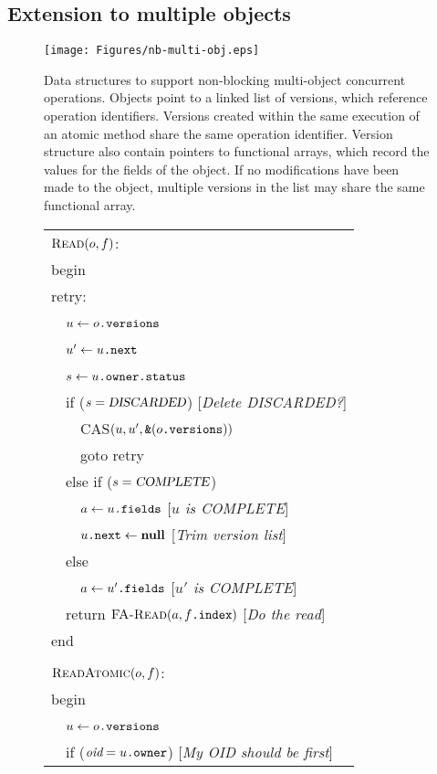 \documentclass{csa-sig-alternate}
\newcommand{\funcname}[1]{\ensuremath{\text{\sc #1}}}
\newcommand{\var}[1]{\ensuremath{\text{\it #1}}}
\newcommand{\fref}[2]{\ensuremath{#1\text{\tt .#2}}}
\newcommand{\addr}[1]{\ensuremath{\text{\tt \&}(#1)}}
\begin{document}
{\subsection{Extension to multiple objects}
\begin{figure}[t]\centering
\texttt{[image: Figures/nb-multi-obj.eps]}
\figadjust%
\caption{Data structures to support non-blocking multi-object
  concurrent operations.  Objects point to a linked list of versions,
  which reference operation identifiers.  Versions created within the
  same execution of an atomic method share the same operation
  identifier.  Version structure also contain pointers to functional
  arrays, which record the values for the fields of the object.
  If no modifications have been made to the object, multiple versions
  in the list may share the same functional array.}
\label{fig:multi-o}
\end{figure}
\begin{figure}[p]
\renewcommand{\>}{~~}
\newcommand{\com}[1]{\hfill [{\sl #1}]}
\begin{tabular}{l}
$\funcname{Read}(o, f)$:\\
begin\\
retry:\\
\>$u \gets \fref{o}{versions}$ \\
\>$u' \gets \fref{u}{next}$ \\
\>$s  \gets \fref{\fref{u}{owner}}{status}$ \\
\>if ($s=\text{\sl DISCARDED}$) \com{Delete DISCARDED?}\\
\>\>CAS$(u, u', \addr{\fref{o}{versions}})$\\
\>\>goto retry \\
\>else if ($s=\text{\sl COMPLETE}$)\\
\>\>$a \gets \fref{u}{fields}$ \com{$u$ is COMPLETE}\\
\>\>$\fref{u}{next} \gets \text{\bf null}$ \com{Trim version list}\\
\>else\\
\>\>$a \gets \fref{u'}{fields}$ \com{$u'$ is COMPLETE}\\
\>return $\funcname{FA-Read}(a, \fref{f}{index})$ \com{Do the read}\\
end\\
\\
$\funcname{ReadAtomic}(o, f)$:\\
begin\\
\>$u \gets \fref{o}{versions}$\\
\>if ($\var{oid} = \fref{u}{owner}$) \com{My OID should be first}\\

\end{tabular}
\end{figure}}
\end{document}
